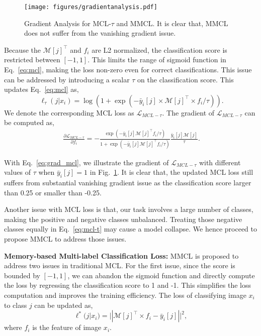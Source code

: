 \documentclass[10pt,twocolumn,letterpaper]{article}
\begin{document}
\begin{figure}
\begin{center}
\texttt{[image: figures/gradientanalysis.pdf]}
\end{center}
   \caption{Gradient Analysis for MCL-$\tau$ and MMCL. It is clear that, MMCL does not suffer from the vanishing gradient issue.}
   \vspace{-2mm}
\label{fig:gradientanalysis}
\end{figure}

Because the $\mathcal{M}[j]^\top$ and $f_i$ are L2 normalized, the classification score is restricted between $[-1,1]$. This limits the range of sigmoid function in Eq.~\eqref{eq:mcl}, making the loss non-zero even for correct classifications. This issue can be addressed by introducing a scalar $\tau$ on the classification score. This updates Eq.~\eqref{eq:mcl} as,
\begin{equation}~\label{eq:mcl-t}
\ell_\tau(j|x_i) = \log (1 + \exp (-\bar y_i[j]\times \mathcal{M}[j]^\top \times f_i/\tau)).
\end{equation}
We denote the corresponding MCL loss as $\mathcal{L}_{MCL-\tau}$. The gradient of $\mathcal{L}_{MCL-\tau}$ can be computed as,
\begin{equation}~\label{eq:grad_mcl}
\begin{aligned}
\frac{\partial{\mathcal{L}_{MCL-\tau}}}{\partial{f_i}} = -\frac{\exp(-\bar y_i[j] \mathcal{M}[j]^\top f_i /\tau)}{1+\exp(-\bar y_i[j]\mathcal{M}[j]^\top f_i/\tau)}\frac{\bar y_i[j]\mathcal{M}[j]}{\tau}.
 \end{aligned}
\end{equation}


With Eq.~\eqref{eq:grad_mcl}, we illustrate the gradient of $\mathcal{L}_{MCL-\tau}$ with different values of $\tau$ when $\bar y_i[j]=1$ in Fig.~\ref{fig:gradientanalysis}. It is clear that, the updated MCL loss still suffers from substantial vanishing gradient issue as the classification score larger than 0.25 or smaller than -0.25.

Another issue with MCL loss is that, our task involves a large number of classes, making the positive and negative classes unbalanced. Treating those negative classes equally in Eq.~\eqref{eq:mcl-t} may cause a model collapse. We hence proceed to propose MMCL to address those issues.

\textbf{Memory-based Multi-label Classification Loss:} MMCL is proposed to address two issues in traditional MCL. For the first issue, since the score is bounded by $[-1,1]$, we can abandon the sigmoid function and directly compute the loss by regressing the classification score to 1 and -1. This simplifies the loss computation and improves the training efficiency. The loss of classifying image $x_i$ to class $j$ can be updated as,
\begin{equation}
\ell^*(j|x_i) = ||\mathcal{M}[j]^\top \times f_i -\bar y_i[j]||^2,
\end{equation}
where $f_i$ is the feature of image $x_i$.
\end{document}
